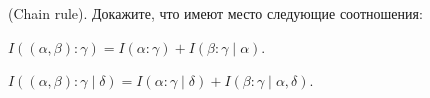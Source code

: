 (Chain rule). Докажите, что имеют место следующие соотношения:
\begin{enumcyr}
    \item $I((\alpha, \beta) : \gamma) = I(\alpha : \gamma) + I(\beta: \gamma \mid \alpha)$.
    \item $I((\alpha, \beta) : \gamma \mid \delta) = I(\alpha : \gamma \mid \delta) + I(\beta: \gamma \mid
        \alpha, \delta)$.
\end{enumcyr}